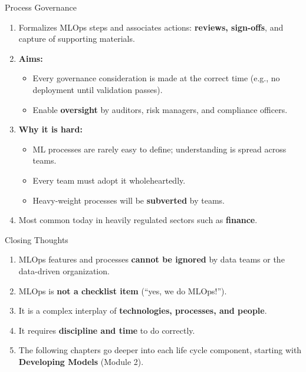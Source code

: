 \begin{frame}{Process Governance}
\begin{enumerate}
\item<1-> Formalizes MLOps steps and associates actions: \textbf{reviews, sign-offs}, and capture of supporting materials.
\item<2-> \textbf{Aims:}
    \begin{itemize}
    \item Every governance consideration is made at the correct time (e.g., no deployment until validation passes).
    \item Enable \textbf{oversight} by auditors, risk managers, and compliance officers.
    \end{itemize}
\item<3-> \textbf{Why it is hard:}
    \begin{itemize}
    \item ML processes are rarely easy to define; understanding is spread across teams.
    \item Every team must adopt it wholeheartedly.
    \item Heavy-weight processes will be \textbf{subverted} by teams.
    \end{itemize}
\item<4-> Most common today in heavily regulated sectors such as \textbf{finance}.
\end{enumerate}
\end{frame}

\begin{frame}{Closing Thoughts}
\begin{enumerate}
\item<1-> MLOps features and processes \textbf{cannot be ignored} by data teams or the data-driven organization.
\item<2-> MLOps is \textbf{not a checklist item} (``yes, we do MLOps!'').
\item<3-> It is a complex interplay of \textbf{technologies, processes, and people}.
\item<4-> It requires \textbf{discipline and time} to do correctly.
\item<5-> The following chapters go deeper into each life cycle component, starting with \textbf{Developing Models} (Module 2).
\end{enumerate}
\end{frame}
